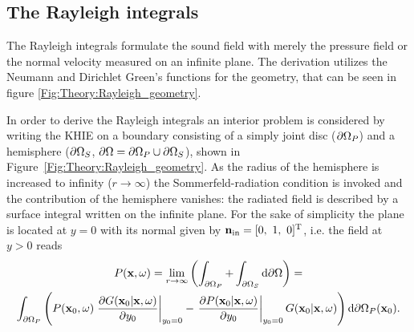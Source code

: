 
\subsection{The Rayleigh integrals}
\label{Section:Theory:Rayleigh}

The Rayleigh integrals formulate the sound field with merely the pressure field or the normal velocity measured on an infinite plane. 
The derivation utilizes the Neumann and Dirichlet Green's functions for the geometry, that can be seen in figure \ref{Fig:Theory:Rayleigh_geometry}.

In order to derive the Rayleigh integrals an interior problem is considered by writing the KHIE on a boundary consisting of a simply joint disc ($\partial \Omega_P$) and a hemisphere ($\partial \Omega_S$, $\partial \Omega = \partial \Omega_P \cup \partial \Omega_S$), shown in Figure\ \ref{Fig:Theory:Rayleigh_geometry}. 
As the radius of the hemisphere is increased to infinity ($r \rightarrow \infty$) the Sommerfeld-radiation condition is invoked and the contribution of the hemisphere vanishes: the radiated field is described by a surface integral written on the infinite plane. 
For the sake of simplicity the plane is located at $y=0$ with its normal given by $\vni = [0,\ 1,\ 0]^{\mathrm{T}}$, i.e. the field at $y>0$ reads
\begin{multline}
P(\mathbf{x},\omega) = \lim_{r\rightarrow \infty} \left( \int_{\partial \Omega_P} + \int_{\partial \Omega_S} \mathrm{d} \partial \Omega \right) = \\
\int_{\partial \Omega_P}  \left( 
P(\mathbf{x}_0,\omega)  
\left. \frac{\partial G(\mathbf{x}_0|\mathbf{x},\omega)}{\partial y_0} \right|_{y_0 = 0} 
-
\left. \frac{\partial P(\mathbf{x}_0|\mathbf{x},\omega)}{\partial y_0} \right|_{y_0 = 0} 
G(\mathbf{x}_0|\mathbf{x},\omega) 
\right)   \mathrm{d} \partial \Omega_P ( \mathbf{x}_0).
\end{multline}

